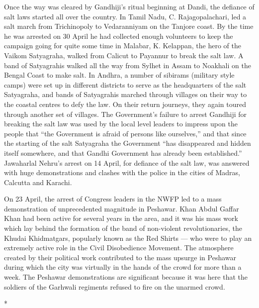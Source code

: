 \begin{multicols}{2}
Once the way was cleared by Gandhiji's ritual beginning at Dandi, the defiance of salt laws started all over the country. In Tamil Nadu, C. Rajagopalachari, led a salt march from Trichinopoly to Vedaranniyam on the Tanjore coast. By the time he was arrested on 30 April he had collected enough volunteers to keep the campaign going for quite some time in Malabar, K. Kelappan, the hero of the Vaikom Satyagraha, walked from Calicut to Payannur to break the salt law. A band of Satyagrahis walked all the way from Sylhet in Assam to Noakhali on the Bengal Coast to make salt. In Andhra, a number of sibirams (military style camps) were set up in different districts to serve as the headquarters of the salt Satyagraha, and bands of Satyagrahis marched through villages on their way to the coastal centres to defy the law. On their return journeys, they again toured through another set of villages. The Government's failure to arrest Gandhiji for breaking the salt law was used by the local level leaders to impress upon the people that ``the Government is afraid of persons like ourselves,'' and that since the starting of the salt Satyagraha the Government ``has disappeared and hidden itself somewhere, and that Gandhi Government has already been established.'' Jawaharlal Nehru's arrest on 14 April, for defiance of the salt law, was answered with huge demonstrations and clashes with the police in the cities of Madras, Calcutta and Karachi.

On 23 April, the arrest of Congress leaders in the NWFP led to a mass demonstration of unprecedented magnitude in Peshawar. Khan Abdul Gaffar Khan had been active for several years in the area, and it was his mass work which lay behind the formation of the band of non-violent revolutionaries, the Khudai Khidmatgars, popularly known as the Red Shirts --- who were to play an extremely active role in the Civil Disobedience Movement. The atmosphere created by their political work contributed to the mass upsurge in Peshawar during which the city was virtually in the hands of the crowd for more than a week. The Peshawar demonstrations are significant because it was here that the soldiers of the Garhwali regiments refused to fire on the unarmed crowd.

\begin{center}*\end{center}


\end{multicols}

